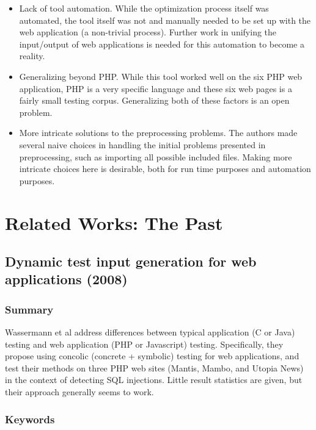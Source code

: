 \documentclass{sig-alternate-05-2015}
\begin{document}
\begin{itemize}
\item Lack of tool automation. While the optimization process itself was automated, the tool itself was not and manually needed to be set up with the web application (a non-trivial process). Further work in unifying the input/output of web applications is needed for this automation to become a reality. 
\item Generalizing beyond PHP. While this tool worked well on the six PHP web application, PHP is a very specific language and these six web pages is a fairly small testing corpus. Generalizing both of these factors is an open problem.
\item More intricate solutions to the preprocessing problems. The authors made several naive choices in handling the initial problems presented in preprocessing, such as importing all possible included files. Making more intricate choices here is desirable, both for run time purposes and automation purposes. 
\end{itemize}





\section{Related Works: The Past}


\subsection{Dynamic test input generation for web applications (2008)}

\subsubsection{Summary}
Wassermann et al \cite{wassermann2008dynamic, wassermann2007sound} address differences between typical application (C or Java) testing and web application (PHP or Javascript) testing. Specifically, they propose using concolic (concrete + symbolic) testing for web applications, and test their methods on three PHP web sites (Mantis, Mambo, and Utopia News) in the context of detecting SQL injections. Little result statistics are given, but their approach generally seems to work.  

\subsubsection{Keywords}
\end{document}
